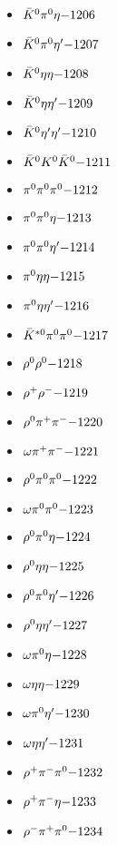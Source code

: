 \begin{multicols}{3}
\begin{itemize}
 \item $ \bar{K}^{0} \pi^{0} \eta \hfill{-1206}$
 \item $ \bar{K}^{0} \pi^{0} {\eta^{\prime}} \hfill{-1207}$
 \item $ \bar{K}^{0} \eta \eta \hfill{-1208}$
 \item $ \bar{K}^{0} \eta {\eta^{\prime}} \hfill{-1209}$
 \item $ \bar{K}^{0} {\eta^{\prime}} {\eta^{\prime}} \hfill{-1210}$
 \item $ \bar{K}^{0} K^{0} \bar{K}^{0} \hfill{-1211}$
 \item $ \pi^{0} \pi^{0} \pi^{0} \hfill{-1212}$
 \item $ \pi^{0} \pi^{0} \eta \hfill{-1213}$
 \item $ \pi^{0} \pi^{0} {\eta^{\prime}} \hfill{-1214}$
 \item $ \pi^{0} \eta \eta \hfill{-1215}$
 \item $ \pi^{0} \eta {\eta^{\prime}} \hfill{-1216}$
 \item $ \bar{K}^{*0} \pi^{0} \pi^{0} \hfill{-1217}$
 \item $ \rho^{0} \rho^{0} \hfill{-1218}$
 \item $ \rho^{+} \rho^{-} \hfill{-1219}$
 \item $ \rho^{0} \pi^{+} \pi^{-} \hfill{-1220}$
 \item $ \omega \pi^{+} \pi^{-} \hfill{-1221}$
 \item $ \rho^{0} \pi^{0} \pi^{0} \hfill{-1222}$
 \item $ \omega \pi^{0} \pi^{0} \hfill{-1223}$
 \item $ \rho^{0} \pi^{0} \eta \hfill{-1224}$
 \item $ \rho^{0} \eta \eta \hfill{-1225}$
 \item $ \rho^{0} \pi^{0} {\eta^{\prime}} \hfill{-1226}$
 \item $ \rho^{0} \eta {\eta^{\prime}} \hfill{-1227}$
 \item $ \omega \pi^{0} \eta \hfill{-1228}$
 \item $ \omega \eta \eta \hfill{-1229}$
 \item $ \omega \pi^{0} {\eta^{\prime}} \hfill{-1230}$
 \item $ \omega \eta {\eta^{\prime}} \hfill{-1231}$
 \item $ \rho^{+} \pi^{-} \pi^{0} \hfill{-1232}$
 \item $ \rho^{+} \pi^{-} \eta \hfill{-1233}$
 \item $ \rho^{-} \pi^{+} \pi^{0} \hfill{-1234}$

\end{itemize}
\end{multicols}
